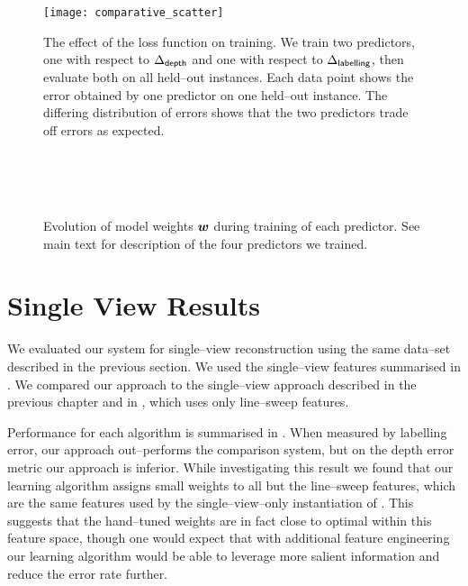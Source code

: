 \begin{figure}[tb]%
  \centering
  \texttt{[image: comparative\_scatter]}
  \caption{The effect of the loss function on training. We train two
    predictors, one with respect to $\DepthLoss$ and one with respect
    to $\LblLoss$, then evaluate both on all held--out instances. Each
    data point shows the error obtained by one predictor on one held--out
    instance. The differing distribution of errors shows that the two
    predictors trade off errors as expected.}
  \label{fig:comparative-scatter}
\end{figure}

\begin{figure}[tb]
  \centering
  \\
  \\
  \\
  \caption{Evolution of model weights $\Model$ during training of each
    predictor. See main text for description of the four predictors we
    trained.}
  \label{fig:psi-evolution}
\end{figure}

\section{Single View Results}
\label{sec:sv-results}

We evaluated our system for single--view reconstruction using the same
data--set described in the previous section. We used the single--view
features summarised in . We compared our approach
to the single--view approach described in the previous chapter and in
\cite{Flint10eccv}, which uses only line--sweep features.

Performance for each algorithm is summarised in
. When measured by labelling error, our
approach out--performs the comparison system, but on the depth error
metric our approach is inferior. While investigating this result we
found that our learning algorithm assigns small weights to all but the
line--sweep features, which are the same features used by the
single--view--only instantiation of . This suggests
that the hand--tuned weights are in fact close to optimal within this
feature space, though one would expect that with additional feature
engineering our learning algorithm would be able to leverage more
salient information and reduce the error rate further.

